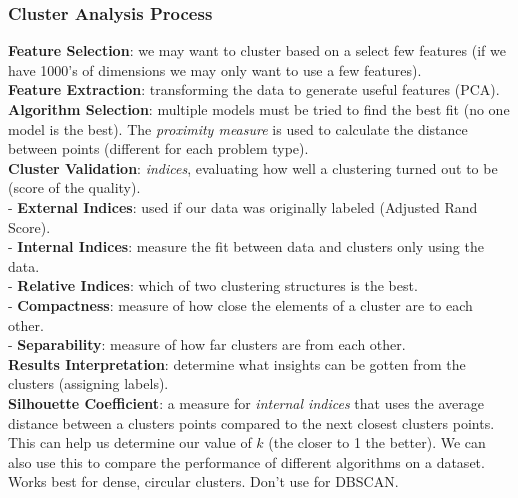 \documentclass[11pt, a4paper]{article}
\begin{document}
\begin{spacing}{1.1}
	\subsubsection{Cluster Analysis Process}
	\textbf{Feature Selection}: we may want to cluster based on a select few features (if we have 1000's of dimensions we may only want to use a few features).\vspace*{2mm}\\
	\textbf{Feature Extraction}: transforming the data to generate useful features (PCA).\vspace*{2mm}\\
	\textbf{Algorithm Selection}: multiple models must be tried to find the best fit (no one model is the best). The \textit{proximity measure} is used to calculate the distance between points (different for each problem  type).\vspace*{2mm}\\
	\textbf{Cluster Validation}: \textit{indices}, evaluating how well a clustering turned out to be (score of the quality).\vspace*{.5mm}\\
	\hspace*{3mm} - \textbf{External Indices}: used if our data was originally labeled (Adjusted Rand Score).\vspace*{.5mm}\\
	\hspace*{3mm} - \textbf{Internal Indices}: measure the fit between data and clusters only using the data.\vspace*{.5mm}\\
	\hspace*{3mm} - \textbf{Relative Indices}: which of two clustering structures is the best.\vspace*{.5mm}\\
	\hspace*{3mm} - \textbf{Compactness}: measure of how close the elements of a cluster are to each other.\vspace*{.5mm}\\
	\hspace*{3mm} - \textbf{Separability}: measure of how far clusters are from each other.\vspace*{.5mm}\\
	\textbf{Results Interpretation}: determine what insights can be gotten from the clusters (assigning labels).\vspace*{2mm}\\
	\textbf{Silhouette Coefficient}: a measure for \textit{internal indices} that uses the average distance between a clusters points compared to the next closest clusters points. This can help us determine our value of $k$ (the closer to 1 the better). We can also use this to compare the performance of different algorithms on a dataset. Works best for dense, circular clusters. Don't use for DBSCAN. \newpage


\end{spacing}
\end{document}
